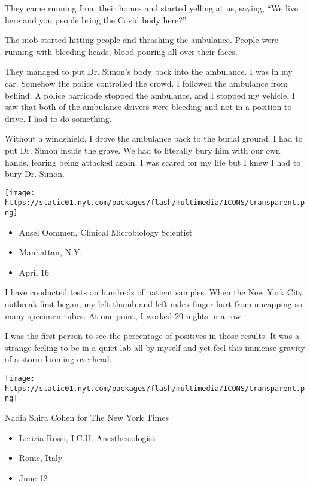 They came running from their homes and started yelling at us, saying,
``We live here and you people bring the Covid body here?''

The mob started hitting people and thrashing the ambulance. People were
running with bleeding heads, blood pouring all over their faces.

They managed to put Dr. Simon's body back into the ambulance. I was in
my car. Somehow the police controlled the crowd. I followed the
ambulance from behind. A police barricade stopped the ambulance, and I
stopped my vehicle. I saw that both of the ambulance drivers were
bleeding and not in a position to drive. I had to do something.

Without a windshield, I drove the ambulance back to the burial ground. I
had to put Dr. Simon inside the grave. We had to literally bury him with
our own hands, fearing being attacked again. I was scared for my life
but I knew I had to bury Dr. Simon.

\texttt{[image: https://static01.nyt.com/packages/flash/multimedia/ICONS/transparent.png]}

\begin{itemize}
\tightlist
\item
  Ansel Oommen, Clinical Microbiology Scientist
\item
  Manhattan, N.Y.
\item
  April 16
\end{itemize}

I have conducted tests on hundreds of patient samples. When the New York
City outbreak first began, my left thumb and left index finger hurt from
uncapping so many specimen tubes. At one point, I worked 20 nights in a
row.

I was the first person to see the percentage of positives in those
results. It was a strange feeling to be in a quiet lab all by myself and
yet feel this immense gravity of a storm looming overhead.

\texttt{[image: https://static01.nyt.com/packages/flash/multimedia/ICONS/transparent.png]}

Nadia Shira Cohen for The New York Times

\begin{itemize}
\tightlist
\item
   Letizia Rossi, I.C.U. Anesthesiologist
\item
  Rome, Italy
\item
  June 12
\end{itemize}

